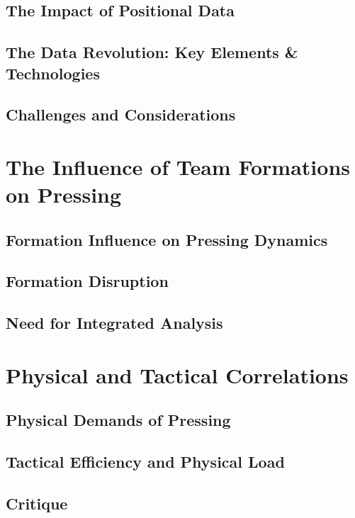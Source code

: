 \subsection{The Impact of Positional Data}


\subsection[The Data Revolution]{The Data Revolution: Key Elements \& Technologies}




\subsection{Challenges and Considerations}


\section{The Influence of Team Formations on Pressing}


\subsection{Formation Influence on Pressing Dynamics}


\subsection{Formation Disruption}


\subsection{Need for Integrated Analysis}


\section{Physical and Tactical Correlations}


\subsection{Physical Demands of Pressing}


\subsection{Tactical Efficiency and Physical Load}


\subsection{Critique}





